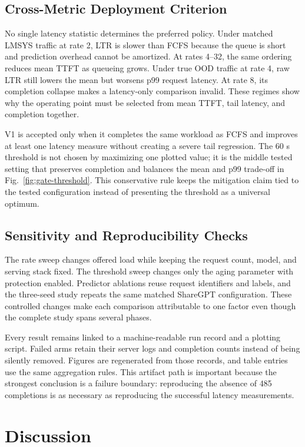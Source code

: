 \documentclass[conference]{IEEEtran}
\begin{document}
\subsection{Cross-Metric Deployment Criterion}
No single latency statistic determines the preferred policy. Under matched LMSYS traffic at rate 2, LTR is slower than FCFS because the queue is short and prediction overhead cannot be amortized. At rates 4--32, the same ordering reduces mean TTFT as queueing grows. Under true OOD traffic at rate 4, raw LTR still lowers the mean but worsens p99 request latency. At rate 8, its completion collapse makes a latency-only comparison invalid. These regimes show why the operating point must be selected from mean TTFT, tail latency, and completion together.

V1 is accepted only when it completes the same workload as FCFS and improves at least one latency measure without creating a severe tail regression. The 60 s threshold is not chosen by maximizing one plotted value; it is the middle tested setting that preserves completion and balances the mean and p99 trade-off in Fig.~\ref{fig:gate-threshold}. This conservative rule keeps the mitigation claim tied to the tested configuration instead of presenting the threshold as a universal optimum.

\subsection{Sensitivity and Reproducibility Checks}
The rate sweep changes offered load while keeping the request count, model, and serving stack fixed. The threshold sweep changes only the aging parameter with protection enabled. Predictor ablations reuse request identifiers and labels, and the three-seed study repeats the same matched ShareGPT configuration. These controlled changes make each comparison attributable to one factor even though the complete study spans several phases.

Every result remains linked to a machine-readable run record and a plotting script. Failed arms retain their server logs and completion counts instead of being silently removed. Figures are regenerated from those records, and table entries use the same aggregation rules. This artifact path is important because the strongest conclusion is a failure boundary: reproducing the absence of 485 completions is as necessary as reproducing the successful latency measurements.

\section{Discussion}
\end{document}
